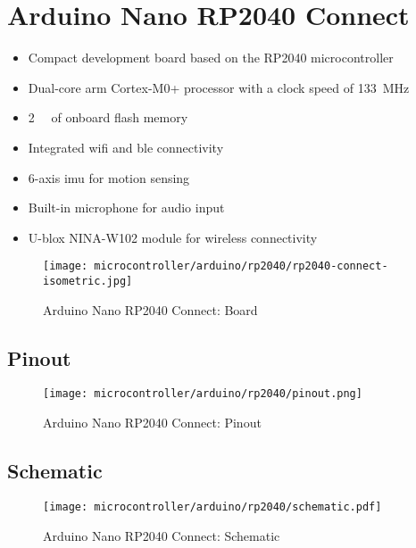 \documentclass[aspectratio=169]{beamer}
\begin{document}

\section{Arduino\textregistered{} Nano RP2040 Connect}

\begin{frame}
    \begin{itemize}
        \item Compact development board based on the RP2040 microcontroller
        \item Dual-core \acs{arm} Cortex-M0+ processor with a clock speed of \SI{133}{\mega\hertz}
        \item \SI{2}{\mebi\byte} of onboard flash memory
        \item Integrated \acs{wifi} and \ac{ble} connectivity
        \item 6-axis \ac{imu} for motion sensing
        \item Built-in microphone for audio input
        \item U-blox NINA-W102 module for wireless connectivity
    \end{itemize}
    \begin{figure}
        \texttt{[image: microcontroller/arduino/rp2040/rp2040-connect-isometric.jpg]}
        \caption{Arduino\textregistered{} Nano RP2040 Connect: Board}
    \end{figure}
\end{frame}

\subsection{Pinout}
\begin{frame}
    \begin{figure}
        \texttt{[image: microcontroller/arduino/rp2040/pinout.png]}
        \caption{Arduino\textregistered{} Nano RP2040 Connect: Pinout}
    \end{figure}
\end{frame}

\subsection{Schematic}
\begin{frame}
    \begin{figure}
        \texttt{[image: microcontroller/arduino/rp2040/schematic.pdf]}
        \caption{Arduino\textregistered{} Nano RP2040 Connect: Schematic}
    \end{figure}
\end{frame}
\end{document}
